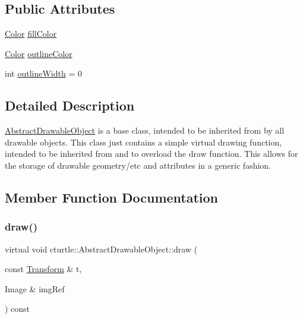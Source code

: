 \subsection*{Public Attributes}
\begin{DoxyCompactItemize}
\item 
\hyperlink{classcturtle_1_1Color}{Color} \hyperlink{classcturtle_1_1AbstractDrawableObject_a37d635a02ad3e5206a6eb99b7b5f1963}{fill\+Color}
\item 
\hyperlink{classcturtle_1_1Color}{Color} \hyperlink{classcturtle_1_1AbstractDrawableObject_abd04640855e7623bb84b52babd8b32b6}{outline\+Color}
\item 
int \hyperlink{classcturtle_1_1AbstractDrawableObject_aeffaecc245057e9a42e5688671a77f52}{outline\+Width} = 0
\end{DoxyCompactItemize}


\subsection{Detailed Description}
\hyperlink{classcturtle_1_1AbstractDrawableObject}{Abstract\+Drawable\+Object} is a base class, intended to be inherited from by all drawable objects. This class just contains a simple virtual drawing function, intended to be inherited from and to overload the draw function. This allows for the storage of drawable geometry/etc and attributes in a generic fashion. 

\subsection{Member Function Documentation}
\mbox{\label{classcturtle_1_1AbstractDrawableObject_a7b1ad1e9743d343e0fe577de3978bdad}} 
\subsubsection{\texorpdfstring{draw()}{draw()}}
{\footnotesize\ttfamily virtual void cturtle\+::\+Abstract\+Drawable\+Object\+::draw (\begin{DoxyParamCaption}\item[{const \hyperlink{classcturtle_1_1Transform}{Transform} \&}]{t,  }\item[{Image \&}]{img\+Ref }\end{DoxyParamCaption}) const\hspace{0.3cm}{\ttfamily [pure virtual]}}



